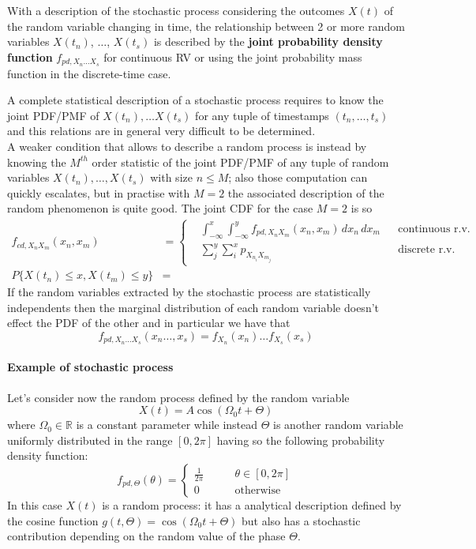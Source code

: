 	With a description of the stochastic process considering the outcomes $X(t)$ of the random variable changing in time, the relationship between 2 or more random variables $X(t_n)$, $\dots$,  $X(t_s)$ is described by the \textbf{joint probability density function} $f_{pd,X_n\dots X_s}$ for continuous RV or using the joint probability mass function in the discrete-time case.
	
	A complete statistical description of a stochastic process requires to know the joint PDF/PMF of $X(t_n),\dots X(t_s)$ for any tuple of timestamps $(t_n,\dots, t_s)$ and this relations are in general very difficult to be determined.\\
	A weaker condition that allows to describe a random process is instead by knowing the $M^{th}$ order statistic of the joint PDF/PMF of any tuple of random variables $X(t_n),\dots, X(t_s)$ with size $n \leq M$; also those computation can quickly escalates, but in practise with $M=2$ the associated description of the random phenomenon is quite good. The joint CDF for the case $M=2$ is so
	\begin{equation}
		\begin{aligned}
		f_{cd,X_nX_m} (x_n,x_m) & =  \left\{ \begin{aligned}
			& \int_{-\infty}^x \int_{-\infty}^y f_{pd, X_nX_m} (x_n,x_m)\, dx_n\, dx_m && \text{continuous r.v.}\\
			& \sum_j^y \sum_i^x p_{X_{n_i}X_{m_j}} && \text{discrete r.v.}
		\end{aligned} \right. \\
		P\big\{ X(t_n) \leq x, X(t_m) \leq y \big\} & =
		\end{aligned}
	\end{equation}
	If the random variables extracted by the stochastic process are statistically independents then the marginal distribution of each random variable doesn't effect the PDF of the other and in particular we have that
	\begin{equation}
		f_{pd,X_n\dots X_s} (x_n\dots, x_s) = f_{X_n}(x_n) \dots f_{X_s}(x_s) 
	\end{equation}
	
	\paragraph{Example of stochastic process} Let's consider now the random process defined by the random variable
	\[ X(t) = A \cos(\Omega_0 t + \Theta) \]
	where $\Omega_0 \in \mathds R$ is a constant parameter while instead $\Theta$ is another random variable uniformly distributed in the range $[0,2\pi]$ having so the following probability density function:
	\[ f_{pd,\Theta}(\theta) = \begin{cases}
		\frac 1 {2\pi} \qquad & \theta\in[0,2\pi] \\ 0 & \textrm{otherwise}
	\end{cases} \]
	In this case $X(t)$ is a random process: it has a analytical description defined by the cosine function $g(t,\Theta) = \cos(\Omega_0t + \Theta)$ but also has a stochastic contribution depending on the random value of the phase $\Theta$. 
	
